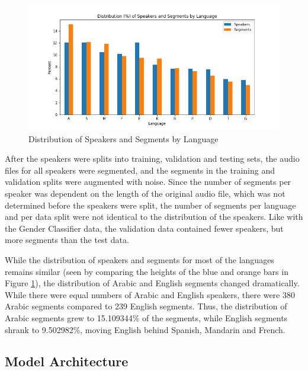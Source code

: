 \begin{figure}[h]
\begin{center}
\includegraphics[width=5in]{LangDistPercentSpSeg.png}
\caption{Distribution of Speakers and Segments by Language}
\label{fig:LangDistTot}
\end{center}
\end{figure}

After the speakers were splits into training, validation and testing sets, the audio files for all speakers were segmented, and the segments in the training and validation splits were augmented with noise. Since the number of segments per speaker was dependent on the length of the original audio file, which was not determined before the speakers were split, the number of segments per language and per data split were not identical to the distribution of the speakers. Like with the Gender Classifier data, the validation data contained fewer speakers, but more segments than the test data.

While the distribution of speakers and segments for most of the languages remains similar (seen by comparing the heights of the blue and orange bars in Figure \ref{fig:LangDistTot}), the distribution of Arabic and English segments changed dramatically. While there were equal numbers of Arabic and English speakers, there were 380 Arabic segments compared to 239 English segments. Thus, the distribution of Arabic segments grew to 15.109344\% of the segments, while English segments shrank to 9.502982\%, moving English behind Spanish, Mandarin and French.

\subsection{Model Architecture}

